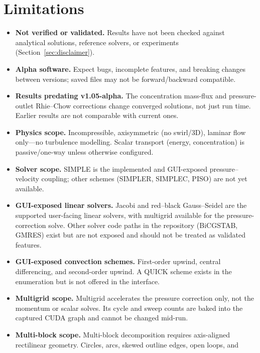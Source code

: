 \documentclass[11pt]{article}
\begin{document}
\section{Limitations}\label{sec:limitations}
\begin{itemize}[nosep]
  \item \textbf{Not verified or validated.} Results have not been checked against
        analytical solutions, reference solvers, or experiments (Section~\ref{sec:disclaimer}).
  \item \textbf{Alpha software.} Expect bugs, incomplete features, and breaking changes
        between versions; saved files may not be forward/backward compatible.
  \item \textbf{Results predating v1.05-alpha.} The concentration mass-flux and
        pressure-outlet Rhie--Chow corrections change converged solutions, not just
        run time. Earlier results are not comparable with current ones.
  \item \textbf{Physics scope.} Incompressible, axisymmetric (no swirl/3D), laminar
        flow only---no turbulence modelling. Scalar transport (energy, concentration)
        is passive/one-way unless otherwise configured.
  \item \textbf{Solver scope.} SIMPLE is the implemented and GUI-exposed
        pressure--velocity coupling; other schemes (SIMPLER, SIMPLEC, PISO) are not yet
        available.
  \item \textbf{GUI-exposed linear solvers.} Jacobi and red--black Gauss--Seidel are the
        supported user-facing linear solvers, with multigrid available for the
        pressure-correction solve. Other solver code paths in the repository
        (BiCGSTAB, GMRES) exist but are not exposed and should not be treated as
        validated features.
  \item \textbf{GUI-exposed convection schemes.} First-order upwind, central
        differencing, and second-order upwind. A QUICK scheme exists in the enumeration
        but is not offered in the interface.
  \item \textbf{Multigrid scope.} Multigrid accelerates the pressure correction only,
        not the momentum or scalar solves. Its cycle and sweep counts are baked into the
        captured CUDA graph and cannot be changed mid-run.
  \item \textbf{Multi-block scope.} Multi-block decomposition requires axis-aligned
        rectilinear geometry. Circles, arcs, skewed outline edges, open loops, and

\end{itemize}
\end{document}
